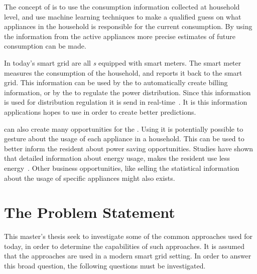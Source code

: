 The concept of  is to use the consumption information collected at household level, and use machine learning techniques to make a qualified guess on what appliances in the household is responsible for the current consumption. By using the information from the active appliances more precise estimates of future consumption can be made. 

In today's smart grid are all \textit{s} equipped with smart meters. The smart meter measures the consumption of the household, and reports it back to the smart grid. This information can be used by the  to automatically create billing information, or by the  to regulate the power distribution. Since this information is used for distribution regulation it is send in real-time~\citep{RefWorks:41}. It is this information  applications hopes to use in order to create better predictions.

 can also create many opportunities for the . Using  it is potentially possible to gesture about the usage of each appliance in a household. This can be used to better inform the resident about power saving opportunities. Studies have shown that detailed information about energy usage, makes the resident use less energy~\citep{RefWorks:33}. Other business opportunities, like selling the statistical information about the usage of specific appliances might also exists.  

\section{The Problem Statement}

This master's thesis seek to investigate some of the common approaches used for  today, in order to determine the capabilities of such approaches. It is assumed that the  approaches are used in a modern smart grid setting. In order to answer this broad question, the following questions must be investigated. 


